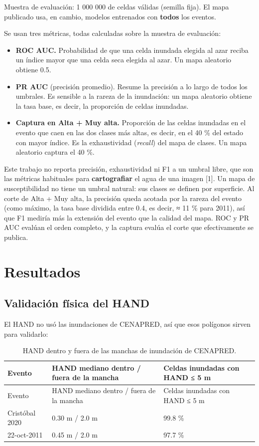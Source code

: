 Muestra de evaluación: 1 000 000 de celdas válidas (semilla fija). El mapa publicado usa, en cambio, modelos entrenados con \textbf{todos} los eventos.

Se usan tres métricas, todas calculadas sobre la muestra de evaluación:

\begin{itemize}
\tightlist
\item
  \textbf{ROC AUC.} Probabilidad de que una celda inundada elegida al azar reciba un índice mayor que una celda seca elegida al azar. Un mapa aleatorio obtiene 0.5.
\item
  \textbf{PR AUC} (precisión promedio). Resume la precisión a lo largo de todos los umbrales. Es sensible a la rareza de la inundación: un mapa aleatorio obtiene la tasa base, es decir, la proporción de celdas inundadas.
\item
  \textbf{Captura en Alta + Muy alta.} Proporción de las celdas inundadas en el evento que caen en las dos clases más altas, es decir, en el 40 \% del estado con mayor índice. Es la exhaustividad (\emph{recall}) del mapa de clases. Un mapa aleatorio captura el 40 \%.
\end{itemize}

Este trabajo no reporta precisión, exhaustividad ni F1 a un umbral libre, que son las métricas habituales para \textbf{cartografiar} el agua de una imagen {[}1{]}. Un mapa de susceptibilidad no tiene un umbral natural: sus clases se definen por superficie. Al corte de Alta + Muy alta, la precisión queda acotada por la rareza del evento (como máximo, la tasa base dividida entre 0.4, es decir, ≈ 11 \% para 2011), así que F1 mediría más la extensión del evento que la calidad del mapa. ROC y PR AUC evalúan el orden completo, y la captura evalúa el corte que efectivamente se publica.

\section{Resultados}

\subsection{Validación física del HAND}

El HAND no usó las inundaciones de CENAPRED, así que esos polígonos sirven para validarlo:

\begin{longtable}[]{@{}lll@{}}
\caption{HAND dentro y fuera de las manchas de inundación de CENAPRED.}\tabularnewline
\toprule\noalign{}
Evento & HAND mediano dentro / fuera de la mancha & Celdas inundadas con HAND ≤ 5 m \\
\midrule\noalign{}
\endfirsthead
\toprule\noalign{}
Evento & HAND mediano dentro / fuera de la mancha & Celdas inundadas con HAND ≤ 5 m \\
\midrule\noalign{}
\endhead
\bottomrule\noalign{}
\endlastfoot
Cristóbal 2020 & 0.30 m / 2.0 m & 99.8 \% \\
22-oct-2011 & 0.45 m / 2.0 m & 97.7 \% \\
\end{longtable}

